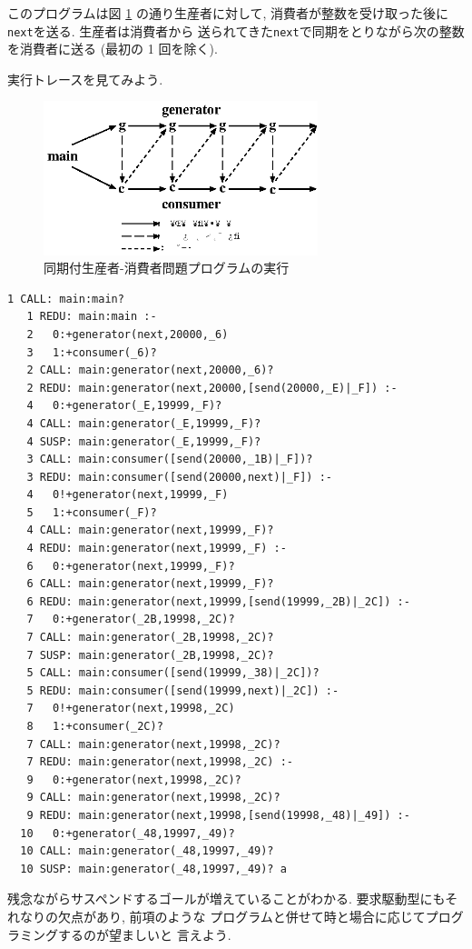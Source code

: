 \documentclass[a4,titlepage]{jsreport}
\begin{document}
このプログラムは図 \ref{prio1-3} の通り生産者に対して, 
消費者が整数を受け取った後に{\tt next}を送る.  生産者は消費者から
送られてきた{\tt next}で同期をとりながら次の整数を消費者に送る (最初の
 1 回を除く).

実行トレースを見てみよう.  

\begin{figure}[t]
\begin{center}
\includegraphics[width=8cm]{fig/pri1-3.eps}
\caption{同期付生産者-消費者問題プログラムの実行}\label{prio1-3}
\end{center}
\end{figure}


\begin{Verbatim}[frame=single,baselinestretch=0.8]
   1 CALL: main:main? 
   1 REDU: main:main :-
   2   0:+generator(next,20000,_6)
   3   1:+consumer(_6)? 
   2 CALL: main:generator(next,20000,_6)? 
   2 REDU: main:generator(next,20000,[send(20000,_E)|_F]) :-
   4   0:+generator(_E,19999,_F)? 
   4 CALL: main:generator(_E,19999,_F)? 
   4 SUSP: main:generator(_E,19999,_F)? 
   3 CALL: main:consumer([send(20000,_1B)|_F])? 
   3 REDU: main:consumer([send(20000,next)|_F]) :-
   4   0!+generator(next,19999,_F)
   5   1:+consumer(_F)? 
   4 CALL: main:generator(next,19999,_F)? 
   4 REDU: main:generator(next,19999,_F) :-
   6   0:+generator(next,19999,_F)? 
   6 CALL: main:generator(next,19999,_F)? 
   6 REDU: main:generator(next,19999,[send(19999,_2B)|_2C]) :-
   7   0:+generator(_2B,19998,_2C)? 
   7 CALL: main:generator(_2B,19998,_2C)? 
   7 SUSP: main:generator(_2B,19998,_2C)? 
   5 CALL: main:consumer([send(19999,_38)|_2C])? 
   5 REDU: main:consumer([send(19999,next)|_2C]) :-
   7   0!+generator(next,19998,_2C)
   8   1:+consumer(_2C)? 
   7 CALL: main:generator(next,19998,_2C)? 
   7 REDU: main:generator(next,19998,_2C) :-
   9   0:+generator(next,19998,_2C)? 
   9 CALL: main:generator(next,19998,_2C)? 
   9 REDU: main:generator(next,19998,[send(19998,_48)|_49]) :-
  10   0:+generator(_48,19997,_49)? 
  10 CALL: main:generator(_48,19997,_49)? 
  10 SUSP: main:generator(_48,19997,_49)? a
\end{Verbatim}
残念ながらサスペンドするゴールが増えていることがわかる.  
要求駆動型にもそれなりの欠点があり, 前項のような
プログラムと併せて時と場合に応じてプログラミングするのが望ましいと
言えよう.  
\end{document}
